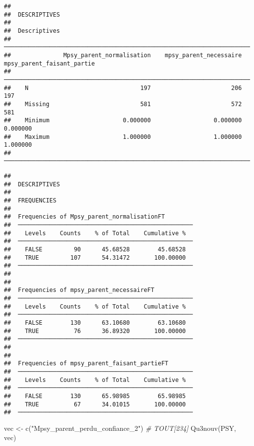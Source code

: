 \documentclass[
]{article}
\newenvironment{Shaded}{\begin{snugshade}}{\end{snugshade}}
\newcommand{\CommentTok}[1]{\textcolor[rgb]{0.56,0.35,0.01}{\textit{#1}}}
\newcommand{\FunctionTok}[1]{\textcolor[rgb]{0.00,0.00,0.00}{#1}}
\newcommand{\NormalTok}[1]{#1}
\newcommand{\OtherTok}[1]{\textcolor[rgb]{0.56,0.35,0.01}{#1}}
\newcommand{\StringTok}[1]{\textcolor[rgb]{0.31,0.60,0.02}{#1}}
\begin{document}
\begin{verbatim}
## 
##  DESCRIPTIVES
## 
##  Descriptives                                                                                     
##  ──────────────────────────────────────────────────────────────────────────────────────────────── 
##               Mpsy_parent_normalisation    mpsy_parent_necessaire    mpsy_parent_faisant_partie   
##  ──────────────────────────────────────────────────────────────────────────────────────────────── 
##    N                                197                       206                           197   
##    Missing                          581                       572                           581   
##    Minimum                     0.000000                  0.000000                      0.000000   
##    Maximum                     1.000000                  1.000000                      1.000000   
##  ────────────────────────────────────────────────────────────────────────────────────────────────
\end{verbatim}

\begin{verbatim}
## 
##  DESCRIPTIVES
## 
##  FREQUENCIES
## 
##  Frequencies of Mpsy_parent_normalisationFT         
##  ────────────────────────────────────────────────── 
##    Levels    Counts    % of Total    Cumulative %   
##  ────────────────────────────────────────────────── 
##    FALSE         90      45.68528        45.68528   
##    TRUE         107      54.31472       100.00000   
##  ────────────────────────────────────────────────── 
## 
## 
##  Frequencies of mpsy_parent_necessaireFT            
##  ────────────────────────────────────────────────── 
##    Levels    Counts    % of Total    Cumulative %   
##  ────────────────────────────────────────────────── 
##    FALSE        130      63.10680        63.10680   
##    TRUE          76      36.89320       100.00000   
##  ────────────────────────────────────────────────── 
## 
## 
##  Frequencies of mpsy_parent_faisant_partieFT        
##  ────────────────────────────────────────────────── 
##    Levels    Counts    % of Total    Cumulative %   
##  ────────────────────────────────────────────────── 
##    FALSE        130      65.98985        65.98985   
##    TRUE          67      34.01015       100.00000   
##  ──────────────────────────────────────────────────
\end{verbatim}

\begin{Shaded}
\begin{Highlighting}[]
\NormalTok{vec }\OtherTok{\textless{}{-}} \FunctionTok{c}\NormalTok{(}\StringTok{"Mpsy\_parent\_perdu\_confiance\_2"}\NormalTok{)                            }\CommentTok{\# TOUT[234]}
\FunctionTok{Qu3nouv}\NormalTok{(PSY, vec)}
\end{Highlighting}
\end{Shaded}
\end{document}
